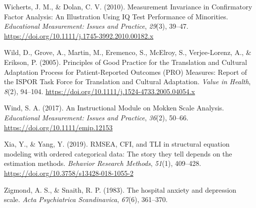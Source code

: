 \documentclass[
  ,doc,11pt, twoside,floatsintext]{apa6}
\newlength{\cslhangindent}
\newlength{\cslentryspacingunit} %
\newenvironment{CSLReferences}[2] %
 {%
  \setlength{\parindent}{0pt}
  \ifodd #1
  \let\oldpar\par
  \def\par{\hangindent=\cslhangindent\oldpar}
  \fi
  \setlength{\parskip}{#2\cslentryspacingunit}
 }%
 {}
\begin{document}
\begin{CSLReferences}{1}{0}
\leavevmode{}%
Wicherts, J. M., \& Dolan, C. V. (2010). Measurement {Invariance} in {Confirmatory Factor Analysis}: {An Illustration Using IQ Test Performance} of {Minorities}. \emph{Educational Measurement: Issues and Practice}, \emph{29}(3), 39--47. \url{https://doi.org/10.1111/j.1745-3992.2010.00182.x}

\leavevmode{}%
Wild, D., Grove, A., Martin, M., Eremenco, S., McElroy, S., Verjee-Lorenz, A., \& Erikson, P. (2005). Principles of {Good Practice} for the {Translation} and {Cultural Adaptation Process} for {Patient-Reported Outcomes} ({PRO}) {Measures}: {Report} of the {ISPOR Task Force} for {Translation} and {Cultural Adaptation}. \emph{Value in Health}, \emph{8}(2), 94--104. \url{https://doi.org/10.1111/j.1524-4733.2005.04054.x}

\leavevmode{}%
Wind, S. A. (2017). An {Instructional Module} on {Mokken Scale Analysis}. \emph{Educational Measurement: Issues and Practice}, \emph{36}(2), 50--66. \url{https://doi.org/10.1111/emip.12153}

\leavevmode{}%
Xia, Y., \& Yang, Y. (2019). {RMSEA}, {CFI}, and {TLI} in structural equation modeling with ordered categorical data: {The} story they tell depends on the estimation methods. \emph{Behavior Research Methods}, \emph{51}(1), 409--428. \url{https://doi.org/10.3758/s13428-018-1055-2}

\leavevmode{}%
Zigmond, A. S., \& Snaith, R. P. (1983). The hospital anxiety and depression scale. \emph{Acta Psychiatrica Scandinavica}, \emph{67}(6), 361--370.

\end{CSLReferences}


\clearpage
\end{document}
